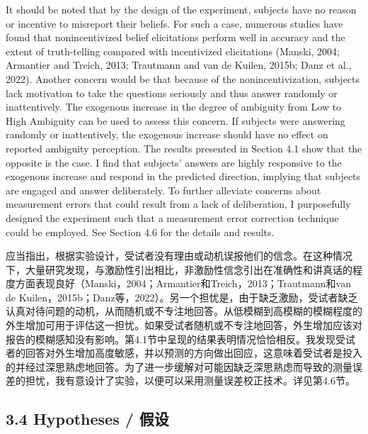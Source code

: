 \documentclass[12pt,a4paper]{article}
\newenvironment{original}
  {\par\medskip\noindent\color{black}\ignorespaces}
  {\par\medskip}
\newenvironment{translation}
  {\par\noindent\color{transblue}\ignorespaces}
  {\par\medskip\medskip}
\begin{document}
\begin{original}
It should be noted that by the design of the experiment, subjects have no reason or incentive to misreport their beliefs. For such a case, numerous studies have found that nonincentivized belief elicitations perform well in accuracy and the extent of truth-telling compared with incentivized elicitations (Manski, 2004; Armantier and Treich, 2013; Trautmann and van de Kuilen, 2015b; Danz et al., 2022). Another concern would be that because of the nonincentivization, subjects lack motivation to take the questions seriously and thus answer randomly or inattentively. The exogenous increase in the degree of ambiguity from Low to High Ambiguity can be used to assess this concern. If subjects were answering randomly or inattentively, the exogenous increase should have no effect on reported ambiguity perception. The results presented in Section 4.1 show that the opposite is the case. I find that subjects' answers are highly responsive to the exogenous increase and respond in the predicted direction, implying that subjects are engaged and answer deliberately. To further alleviate concerns about measurement errors that could result from a lack of deliberation, I purposefully designed the experiment such that a measurement error correction technique could be employed. See Section 4.6 for the details and results.
\end{original}

\begin{translation}
应当指出，根据实验设计，受试者没有理由或动机误报他们的信念。在这种情况下，大量研究发现，与激励性引出相比，非激励性信念引出在准确性和讲真话的程度方面表现良好（Manski，2004；Armantier和Treich，2013；Trautmann和van de Kuilen，2015b；Danz等，2022）。另一个担忧是，由于缺乏激励，受试者缺乏认真对待问题的动机，从而随机或不专注地回答。从低模糊到高模糊的模糊程度的外生增加可用于评估这一担忧。如果受试者随机或不专注地回答，外生增加应该对报告的模糊感知没有影响。第4.1节中呈现的结果表明情况恰恰相反。我发现受试者的回答对外生增加高度敏感，并以预测的方向做出回应，这意味着受试者是投入的并经过深思熟虑地回答。为了进一步缓解对可能因缺乏深思熟虑而导致的测量误差的担忧，我有意设计了实验，以便可以采用测量误差校正技术。详见第4.6节。
\end{translation}

\subsection{3.4 Hypotheses / 假设}
\end{document}
